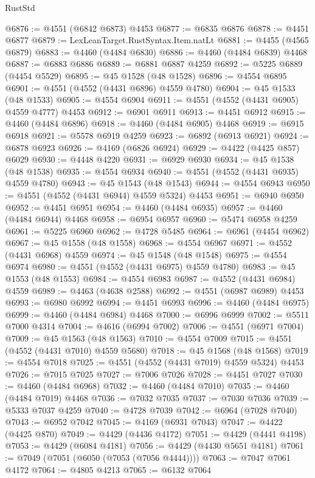 \begin{lexlean}{RustStd}
\begin{coremodule}
@6876 := @4551 (@6842 @6873) @4453
@6877 := @6835 @6876
@6878 := @4451 @6877
@6879 := LexLeanTarget.RustSyntax.Item.natLt
@6881 := @4455 (@4565 @6879)
@6883 := @4460 (@4484 @6830)
@6886 := @4460 (@4484 @6839) @4468
@6887 := @6883 @6886
@6889 := @6881 @6887 @4259
@6892 := @5225 @6889 (@4454 @5529)
@6895 := @45 @1528 (@48 @1528)
@6896 := @4554 @6895
@6901 := @4551 (@4552 (@4431 @6896) @4559 @4780)
@6904 := @45 @1533 (@48 @1533)
@6905 := @4554 @6904
@6911 := @4551 (@4552 (@4431 @6905) @4559 @4777) @4453
@6912 := @6901 @6911
@6913 := @4451 @6912
@6915 := @4460 (@4484 @6896)
@6918 := @4460 (@4484 @6905) @4468
@6919 := @6915 @6918
@6921 := @5578 @6919 @4259
@6923 := @6892 (@6913 @6921)
@6924 := @6878 @6923
@6926 := @4169 (@6826 @6924)
@6929 := @4422 (@4425 @857) @6029
@6930 := @4448 @4220
@6931 := @6929 @6930
@6934 := @45 @1538 (@48 @1538)
@6935 := @4554 @6934
@6940 := @4551 (@4552 (@4431 @6935) @4559 @4780)
@6943 := @45 @1543 (@48 @1543)
@6944 := @4554 @6943
@6950 := @4551 (@4552 (@4431 @6944) @4559 @5324) @4453
@6951 := @6940 @6950
@6952 := @4451 @6951
@6954 := @4460 (@4484 @6935)
@6957 := @4460 (@4484 @6944) @4468
@6958 := @6954 @6957
@6960 := @5474 @6958 @4259
@6961 := @5225 @6960
@6962 := @4728 @5485
@6964 := @6961 (@4454 @6962)
@6967 := @45 @1558 (@48 @1558)
@6968 := @4554 @6967
@6971 := @4552 (@4431 @6968) @4559
@6974 := @45 @1548 (@48 @1548)
@6975 := @4554 @6974
@6980 := @4551 (@4552 (@4431 @6975) @4559 @4780)
@6983 := @45 @1553 (@48 @1553)
@6984 := @4554 @6983
@6987 := @4552 (@4431 @6984) @4559
@6989 := @4463 (@4638 @2588)
@6992 := @4551 (@6987 @6989) @4453
@6993 := @6980 @6992
@6994 := @4451 @6993
@6996 := @4460 (@4484 @6975)
@6999 := @4460 (@4484 @6984) @4468
@7000 := @6996 @6999
@7002 := @5511 @7000 @4314
@7004 := @4616 (@6994 @7002)
@7006 := @4551 (@6971 @7004)
@7009 := @45 @1563 (@48 @1563)
@7010 := @4554 @7009
@7015 := @4551 (@4552 (@4431 @7010) @4559 @5680)
@7018 := @45 @1568 (@48 @1568)
@7019 := @4554 @7018
@7025 := @4551 (@4552 (@4431 @7019) @4559 @5324) @4453
@7026 := @7015 @7025
@7027 := @7006 @7026
@7028 := @4451 @7027
@7030 := @4460 (@4484 @6968)
@7032 := @4460 (@4484 @7010)
@7035 := @4460 (@4484 @7019) @4468
@7036 := @7032 @7035
@7037 := @7030 @7036
@7039 := @5333 @7037 @4259
@7040 := @4728 @7039
@7042 := @6964 (@7028 @7040)
@7043 := @6952 @7042
@7045 := @4169 (@6931 @7043)
@7047 := @4422 (@4425 @870)
@7049 := @4429 (@4436 @4172)
@7051 := @4429 (@4441 @4198)
@7053 := @4429 (@6084 @4181)
@7056 := @4429 (@4430 @5651 @4181)
@7061 := @7049 (@7051 (@6050 (@7053 (@7056 @4444))))
@7063 := @7047 @7061 @4172
@7064 := @4805 @4213
@7065 := @6132 @7064

\end{coremodule}
\end{lexlean}
